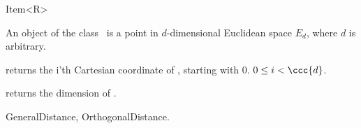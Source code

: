 

\begin{ccRefConcept}{Item<R>}


\ccDefinition
  
An object of the class \ccClassTemplateName\ is a point in $d$-dimensional
Euclidean space $E_d$, where $d$ is arbitrary. 

\ccTypes


\ccCreation
{}  %





\ccOperations



        {returns the i'th Cartesian coordinate of \ccVar, starting
        with 0. \ccPrecond $0\leq i < \ccc{d}$.}

        {returns the dimension  of \ccVar.}


\ccHasModels


\ccSeeAlso

GeneralDistance, OrthogonalDistance.

\end{ccRefConcept}


